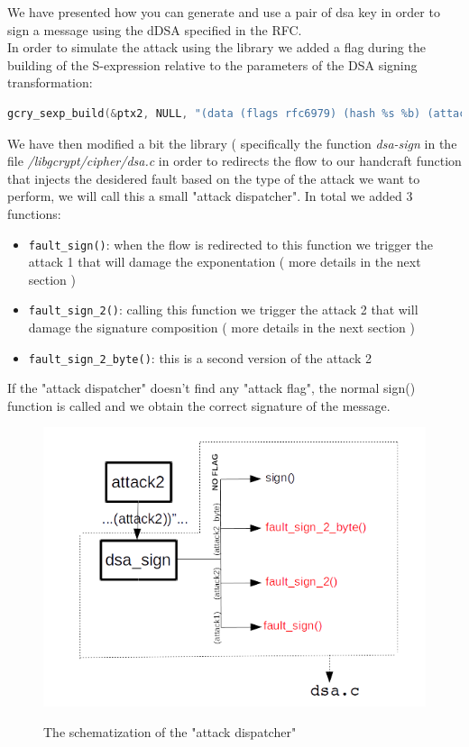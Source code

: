 \documentclass[11pt,english]{article}
\begin{document}
We have presented how you can generate and use a pair of dsa key in order to sign a message using the dDSA specified in the RFC\cite{rfc}. \\
In order to simulate the attack using the library we added a flag during the building of the S-expression relative to the parameters of the DSA signing transformation:

\begin{lstlisting}[language=c]
gcry_sexp_build(&ptx2, NULL, "(data (flags rfc6979) (hash %s %b) (attack2))" , "sha1", hash_len , digest);
\end{lstlisting}

We have then modified a bit the library ( specifically the function \textit{dsa-sign} in the file \textit{/libgcrypt/cipher/dsa.c} in order to redirects the flow to our handcraft function that injects the desidered fault based on the type of the attack we want to perform, we will call this a small "attack dispatcher". In total we added 3 functions:
\begin{itemize}
\item \texttt{fault\_sign()}: when the flow is redirected to this function we trigger the attack 1 that will damage the exponentation ( more details in the next section )
\item \texttt{fault\_sign\_2()}: calling this function we trigger the attack 2 that will damage the signature composition ( more details in the next section )
\item \texttt{fault\_sign\_2\_byte()}: this is a second version of the attack 2
\end{itemize}

If the "attack dispatcher" doesn't find any "attack flag", the normal sign() function is called and we obtain the correct signature of the message. 

\begin{figure}[H]
\includegraphics[width=1.0\textwidth]{img/img_3.png} \\
\caption{The schematization of the "attack dispatcher"}
\end{figure}
\end{document}
